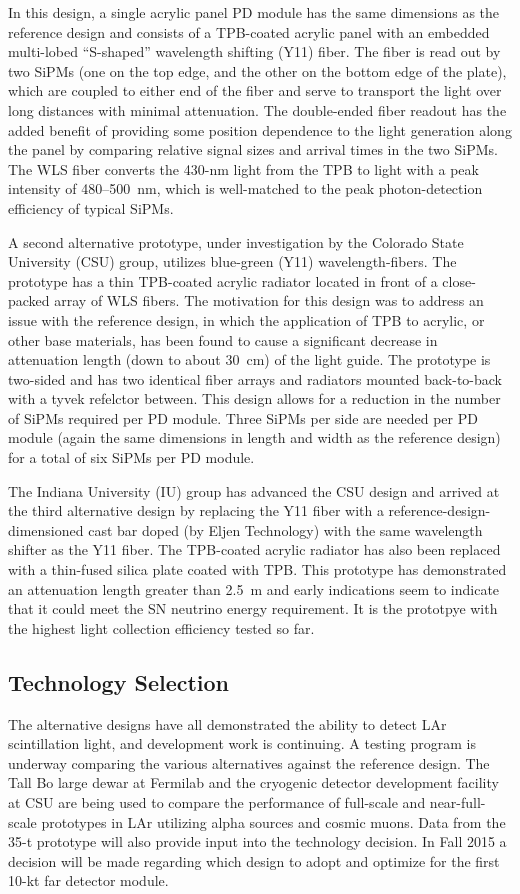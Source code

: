 In this design, a single acrylic panel PD module has the same
dimensions as the reference design and consists of a TPB-coated
acrylic panel with an embedded multi-lobed ``S-shaped'' wavelength
shifting (Y11) fiber. The fiber is read out by two SiPMs (one on the
top edge, and the other on the bottom edge of the plate), which are
coupled to either end of the fiber and serve to transport the light
over long distances with minimal attenuation. The double-ended fiber
readout has the added benefit of providing some position dependence to
the light generation along the panel by comparing relative signal
sizes and arrival times in the two SiPMs. The WLS fiber converts the
430-nm light from the TPB to light with a peak intensity of
480--500~nm, which is well-matched to the peak photon-detection
efficiency of typical SiPMs.

A second alternative prototype, under investigation by the Colorado
State University (CSU) group, utilizes blue-green (Y11)
wavelength-fibers. The prototype has a thin TPB-coated acrylic
radiator located in front of a close-packed array of WLS fibers. The
motivation for this design was to address an issue with the reference
design, in which the application of TPB to acrylic, or other base
materials, has been found to cause a significant decrease in
attenuation length (down to about 30~cm) of the light guide. The
prototype is two-sided and has two identical fiber arrays and
radiators mounted back-to-back with a tyvek refelctor between. This
design allows for a reduction in the number of SiPMs required per PD
module. Three SiPMs per side are needed per PD module (again the same
dimensions in length and width as the reference design) for a total of
six SiPMs per PD module.

The Indiana University (IU) group has advanced the CSU design and arrived
at the third alternative design by replacing the Y11 fiber with a
reference-design-dimensioned cast bar doped (by Eljen Technology) with
the same wavelength shifter as the Y11 fiber. The TPB-coated acrylic
radiator has also been replaced with a thin-fused silica plate coated
with TPB. This prototype has demonstrated an attenuation length
greater than 2.5~m and early indications seem to indicate that it
could meet the SN neutrino energy requirement. It is the 
prototpye with the highest light collection efficiency tested so far.

\subsection{Technology Selection}

The alternative designs have all demonstrated the ability to detect
LAr scintillation light, and development work is continuing. A testing
program is underway comparing the various alternatives against the
reference design.  The Tall Bo large dewar at Fermilab and the
cryogenic detector development facility at CSU are being used to
compare the performance of full-scale and near-full-scale prototypes
in LAr utilizing alpha sources and cosmic muons. Data from the 35-t
prototype will also provide input into the technology decision. In
Fall 2015 a decision will be made regarding which design to adopt and
optimize for the first 10-kt far detector module.
